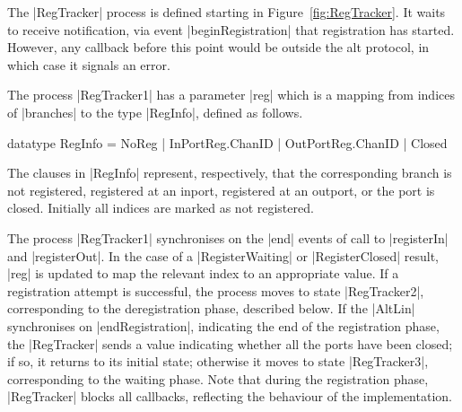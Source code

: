 


The |RegTracker| process is defined starting in Figure~\ref{fig:RegTracker}.
It waits to receive notification, via event |beginRegistration| that
registration has started.  However, any callback before this point would be
outside the alt protocol, in which case it signals an error.

The process |RegTracker1| has a parameter |reg| which is a mapping from
indices of |branches| to the type |RegInfo|, defined as follows.
%
\begin{cspm}
  datatype RegInfo = NoReg | InPortReg.ChanID | OutPortReg.ChanID | Closed
\end{cspm}
%
The clauses in |RegInfo| represent, respectively, that the corresponding
branch is not registered, registered at an inport, registered at an outport,
or the port is closed.  Initially all indices are marked as not registered.

The process |RegTracker1| synchronises on the |end| events of call to
|registerIn| and |registerOut|.  In the case of a |RegisterWaiting| or
|RegisterClosed| result, |reg| is updated to map the relevant index to an
appropriate value.
%
If a registration attempt is successful, the process moves to state
|RegTracker2|, corresponding to the deregistration phase, described below.  If
the |AltLin| synchronises on |endRegistration|, indicating the end of the
registration phase, the |RegTracker| sends a value indicating whether all the
ports have been closed; if so, it returns to its initial state; otherwise it
moves to state |RegTracker3|, corresponding to the waiting phase.
%
Note that during the registration phase, |RegTracker| blocks all callbacks,
reflecting the behaviour of the implementation. 


